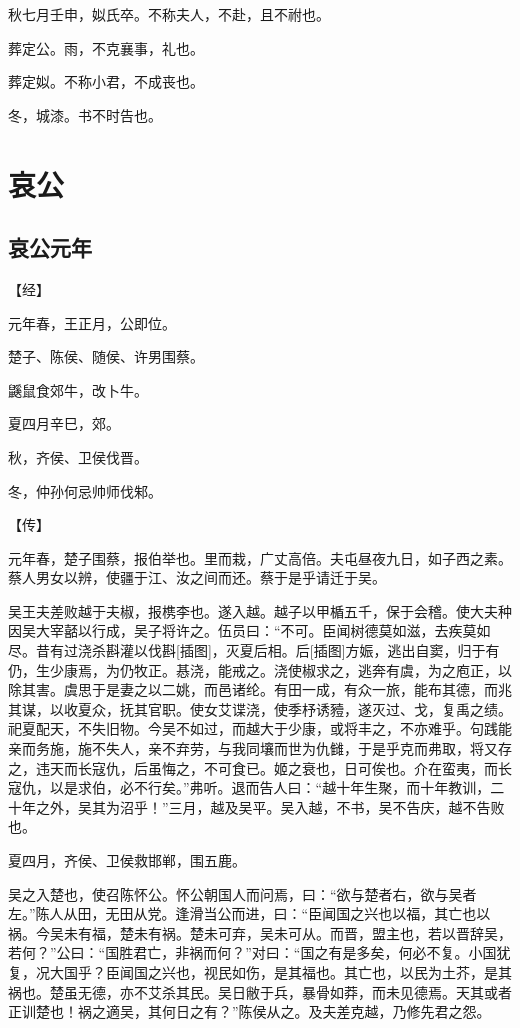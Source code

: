 \documentclass[a4paper,12pt,UTF8,twoside]{ctexbook}
\begin{document}
秋七月壬申，姒氏卒。不称夫人，不赴，且不祔也。

葬定公。雨，不克襄事，礼也。

葬定姒。不称小君，不成丧也。

冬，城漆。书不时告也。


\chapter{哀公}

\section{哀公元年}



【经】

元年春，王正月，公即位。

楚子、陈侯、随侯、许男围蔡。

鼷鼠食郊牛，改卜牛。

夏四月辛巳，郊。

秋，齐侯、卫侯伐晋。

冬，仲孙何忌帅师伐邾。

【传】

元年春，楚子围蔡，报伯举也。里而栽，广丈高倍。夫屯昼夜九日，如子西之素。蔡人男女以辨，使疆于江、汝之间而还。蔡于是乎请迁于吴。

吴王夫差败越于夫椒，报槜李也。遂入越。越子以甲楯五千，保于会稽。使大夫种因吴大宰嚭以行成，吴子将许之。伍员曰：“不可。臣闻树德莫如滋，去疾莫如尽。昔有过浇杀斟灌以伐斟[插图]，灭夏后相。后[插图]方娠，逃出自窦，归于有仍，生少康焉，为仍牧正。惎浇，能戒之。浇使椒求之，逃奔有虞，为之庖正，以除其害。虞思于是妻之以二姚，而邑诸纶。有田一成，有众一旅，能布其德，而兆其谋，以收夏众，抚其官职。使女艾谍浇，使季杼诱豷，遂灭过、戈，复禹之绩。祀夏配天，不失旧物。今吴不如过，而越大于少康，或将丰之，不亦难乎。句践能亲而务施，施不失人，亲不弃劳，与我同壤而世为仇雠，于是乎克而弗取，将又存之，违天而长寇仇，后虽悔之，不可食已。姬之衰也，日可俟也。介在蛮夷，而长寇仇，以是求伯，必不行矣。”弗听。退而告人曰：“越十年生聚，而十年教训，二十年之外，吴其为沼乎！”三月，越及吴平。吴入越，不书，吴不告庆，越不告败也。

夏四月，齐侯、卫侯救邯郸，围五鹿。

吴之入楚也，使召陈怀公。怀公朝国人而问焉，曰：“欲与楚者右，欲与吴者左。”陈人从田，无田从党。逢滑当公而进，曰：“臣闻国之兴也以福，其亡也以祸。今吴未有福，楚未有祸。楚未可弃，吴未可从。而晋，盟主也，若以晋辞吴，若何？”公曰：“国胜君亡，非祸而何？”对曰：“国之有是多矣，何必不复。小国犹复，况大国乎？臣闻国之兴也，视民如伤，是其福也。其亡也，以民为土芥，是其祸也。楚虽无德，亦不艾杀其民。吴日敝于兵，暴骨如莽，而未见德焉。天其或者正训楚也！祸之適吴，其何日之有？”陈侯从之。及夫差克越，乃修先君之怨。
\end{document}
